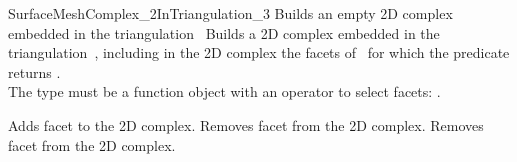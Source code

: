 \begin{ccRefConcept}{SurfaceMeshComplex_2InTriangulation_3}
{}
 {Builds an empty 2D complex embedded in the triangulation~}
\ccGlue
{}
{Builds a 2D complex embedded in the triangulation~,
including in the 2D complex the facets of~ for 
 which the predicate  returns .\\
The type  must be
a function object with an operator to select facets:
.}


\ccGlue
{}
{Adds facet  to the 2D complex.}
\ccGlue
{}
{Removes facet  from  the 2D complex.}
\ccGlue
{}
{Removes facet  from the 2D complex.}


\end{ccRefConcept}
